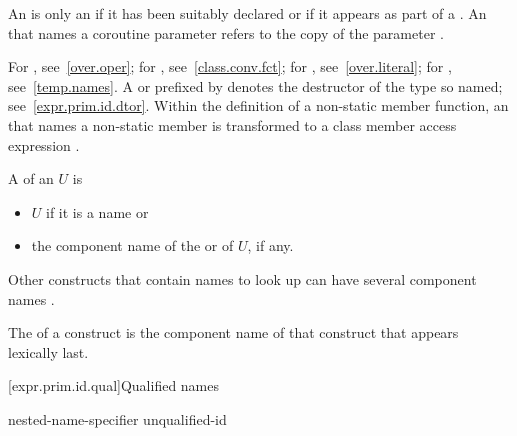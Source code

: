 \documentclass{wg21}
\begin{document}
\pnum
{}
An  is only
an  if it has
been suitably declared 
or if it appears as part of a  .
An  that names a coroutine parameter
refers to the copy of the parameter .

\begin{note}
    For , see~\ref{over.oper}; for
    , see~\ref{class.conv.fct}; for
    , see~\ref{over.literal}; for
    , see~\ref{temp.names}.
    A  or 
    prefixed by \tcode{\~} denotes the destructor of the type so named;
    see~\ref{expr.prim.id.dtor}.
    Within the definition of a non-static member function, an
     that names a non-static member is transformed to a
    class member access expression .
\end{note}

\pnum
A  of an  $U$ is
\begin{itemize}
    \item
    $U$ if it is a name or
    \item
    the component name of
    the  or  of $U$, if any.
\end{itemize}

\begin{note}
    Other constructs that contain names to look up can have several
    component names .
\end{note}

The  of a construct is
the component name of that construct that appears lexically last.


[expr.prim.id.qual]{Qualified names}

%
%
%
\begin{bnf}
    \br
    nested-name-specifier  unqualified-id
\end{bnf}
\end{document}
